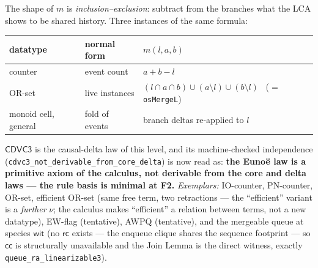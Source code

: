 \documentclass[11pt]{article}
\newcommand{\cd}{\mathsf{CDVC3}}
\newcommand{\lean}[1]{\texttt{#1}}
\newcommand{\rc}{\mathsf{rc}}
\newcommand{\cc}{\mathsf{cc}}
\newcommand{\wit}{\mathsf{wit}}
\begin{document}
The shape of $m$ is \emph{inclusion--exclusion}: subtract from the
branches what the LCA shows to be shared history. Three instances of the
same formula:

\begin{center}
\begin{tabular}{@{}lll@{}}
\toprule
datatype & normal form & $m(l, a, b)$ \\
\midrule
counter & event count & $a + b - l$ \\
OR-set & live instances &
  $(l \cap a \cap b) \cup (a \setminus l) \cup (b \setminus l)$
  \ ($=$ \lean{osMergeL}) \\
monoid cell, general & fold of events & branch deltas re-applied to $l$ \\
\bottomrule
\end{tabular}
\end{center}

$\cd$ is the causal-delta law of this level, and its machine-checked
independence (\lean{cdvc3\_not\_derivable\_from\_core\_delta}) is now read
as: \textbf{the Euno\"e law is a primitive axiom of the calculus, not
derivable from the core and delta laws --- the rule basis is minimal at
F2.} \emph{Exemplars:} IO-counter, PN-counter, OR-set, efficient OR-set
(same free term, two retractions --- the ``efficient'' variant is a
\emph{further} $\nu$; the calculus makes ``efficient'' a relation between
terms, not a new datatype), EW-flag (tentative), AWPQ (tentative), and the
mergeable queue at species $\wit$ (no $\rc$ exists --- the enqueue clique
shares the sequence footprint --- so $\cc$ is structurally unavailable and
the Join Lemma is the direct witness, exactly
\lean{queue\_ra\_linearizable3}).
\end{document}
